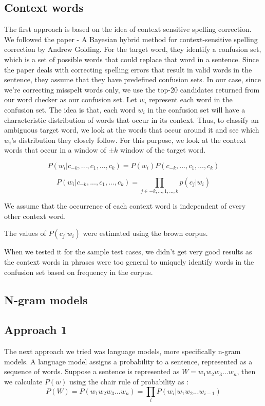 \subsection{Context words}
The first approach is based on the idea of context sensitive spelling correction. We followed the paper - A Bayesian hybrid method for context-sensitive spelling correction by Andrew Golding. For the target word, they identify a confusion set, which is a set of possible words that could replace that word in a sentence. Since the paper deals with correcting spelling errors that result in valid words in the sentence, they assume that they have predefined confusion sets. In our case, since we're correcting misspelt words only, we use the top-20 candidates returned from our word checker as our confusion set. Let $w_i$ represent each word in the confusion set. The idea is that, each word $w_i$ in the confusion set will have a
characteristic distribution of words that occur in its context. Thus, to classify an ambiguous target word, we look at the words that occur around it and see which $w_i$'s distribution they closely follow. For this purpose, we look at the context words that occur in a window of $\pm k$ window of the target word. 

\[P(w_i|c_{-k},...,c_{1},...,c_{k}) = P(w_i) P(c_{-k},...,c_{1},...,c_{k})\]

\[P(w_i|c_{-k},...,c_{1},...,c_{k}) = \prod_{j \in -k,...,1,...,k} p(c_j|w_i) \]

We assume that the occurrence of each context word is independent of every other context word.

The values of $P(c_j|w_i)$ were estimated using the brown corpus.

When we tested it for the sample test cases, we didn't get very good results as the context words in phrases were too general to uniquely identify words in the confusion set based on frequency in the corpus.

\subsection{N-gram models}
\subsection*{Approach 1}
The next approach we tried was language models, more specifically n-gram models. A language model assigns a probability to a sentence, represented as a sequence of words. Suppose a sentence is represented as $W = w_1w_2w_3...w_n$, then we calculate $P(w)$ using the chair rule of probability as :
\[P(W) = P(w_1w_2w_3...w_n) = \prod_i P(w_i|w_1w_2...w_{i-1})\]

